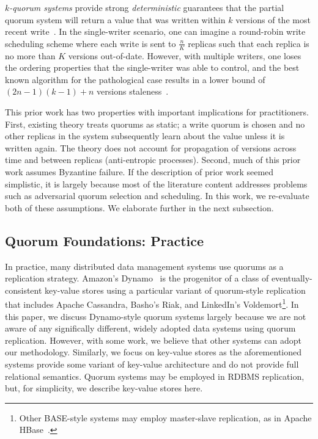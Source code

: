 \documentclass{vldb}
\begin{document}
\textit{$k$-quorum systems} provide strong \textit{deterministic}
guarantees that the partial quorum system will return a value that was
written within $k$ versions of the most recent
write~\cite{nonstrict-availability}.  In the single-writer scenario,
one can imagine a round-robin write scheduling scheme where each write
is sent to $\frac{n}{K}$ replicas such that each replica is no more
than $K$ versions out-of-date.  However, with multiple writers, one
loses the ordering properties that the single-writer was able to
control, and the best known algorithm for the pathological case
results in a lower bound of $(2n-1)(k-1)+n$ versions staleness~\cite{k-quorum-lb}.

This prior work has two properties with important implications for
practitioners.  First, existing theory treats quorums as static; a
write quorum is chosen and no other replicas in the system
subsequently learn about the value unless it is written again.  The
theory does not account for propagation of versions across time and
between replicas (anti-entropic processes).  Second, much of this
prior work assumes Byzantine failure.  If the description of prior
work seemed simplistic, it is largely because most of the literature
content addresses problems such as adversarial quorum selection and
scheduling.  In this work, we re-evaluate both of these assumptions.  We
elaborate further in the next subsection.

\subsection{Quorum Foundations: Practice}
\label{sec:practice}

In practice, many distributed data management systems use quorums as a
replication strategy. Amazon's Dynamo~\cite{dynamo} is the progenitor
of a class of eventually-consistent key-value stores using a
particular variant of quorum-style replication that includes Apache
Cassandra, Basho's Riak, and LinkedIn's Voldemort\footnote{Other
  BASE-style systems may employ master-slave replication, as in Apache
  HBase~\cite{hbase}.}.  In this paper, we discuss Dynamo-style quorum
systems largely because we are not aware of any significally
different, widely adopted data systems using quorum replication.
However, with some work, we believe that other systems can adopt our
methodology.  Similarly, we focus on key-value stores as the
aforementioned systems provide some variant of key-value architecture
and do not provide full relational semantics.  Quorum systems may be
employed in RDBMS replication, but, for simplicity, we describe
key-value stores here.
\end{document}
